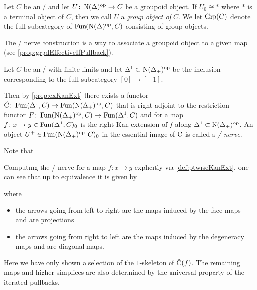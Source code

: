 \begin{definition}\label{def:grpObj}
    Let $C$ be an \inftycat/ and let $U\colon\operatorname{N}(\Delta)^{\operatorname{op}}\to C$ be a groupoid object.
    If $U_0\cong *$ where $*$ is a terminal object of $C$, then we call $U$ a \emph{group object of $C$}.
    We let $\operatorname{Grp}(C)$ denote the full subcategory of $\operatorname{Fun}(\operatorname{N}(\Delta)^{\operatorname{op}},C)$ consisting of group objects.
\end{definition}
The \Cech/ nerve construction is a way to associate a groupoid object to a given map (see \cref{prop:grpdEffectiveIfPullback}).
\begin{definition}
    Let $C$ be an \inftycat/ with finite limits and let $\Delta^1\subset\operatorname{N}(\Delta_+)^{\operatorname{op}}$ be the inclusion corresponding to the full subcategory $[0]\to[-1]$.
    
    Then by \cref{prop:exKanExt} there exists a functor $\CN\colon\Fun(\Delta^1,C)\to\Fun(\N(\Delta_+)^{\op},C)$ that is right adjoint to the restriction functor $F\colon\operatorname{Fun}(\operatorname{N}(\Delta_+)^{\operatorname{op}},C)\to\operatorname{Fun}(\Delta^1,C)$ and for a map $f\colon x\to y\in\operatorname{Fun}(\Delta^1,C)_0$ is the right Kan-extension of $f$ along $\Delta^1\subset\operatorname{N}(\Delta_+)^{\operatorname{op}}$.
    An object $U^+\in\operatorname{Fun}(\operatorname{N}(\Delta_+)^{\operatorname{op}},C)_0$ in the essential image of $\CN$ is called a \emph{\Cech/ nerve}.

    Note that 
\end{definition}
\begin{remark}\label{rmk:cechNerveExplicit}
    Computing the \Cech/ nerve for a map $f\colon x\to y$ explicitly via \cref{def:ptwiseKanExt}, one can see that up to equivalence it is given by
    \begin{center}
    \end{center}
    where
    \begin{itemize}
        \item the arrows going from left to right are the maps induced by the face maps and are projections 
        \item the arrows going from right to left are the maps induced by the degeneracy maps and are diagonal maps. 
    \end{itemize}
    Here we have only shown a selection of the $1$-skeleton of $\CN(f)$.
    The remaining maps and higher simplices are also determined by the universal property of the iterated pullbacks.
\end{remark}
